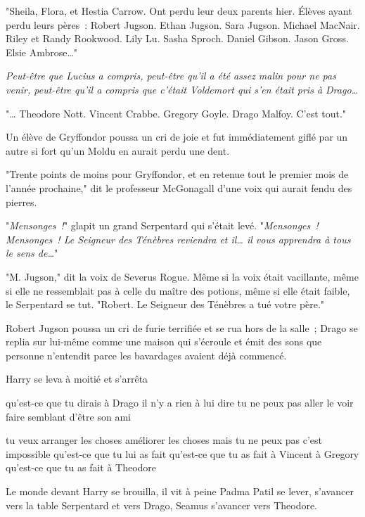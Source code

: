 "Sheila, Flora, et Hestia Carrow. Ont perdu leur deux parents hier. Élèves ayant perdu leurs pères~: Robert Jugson. Ethan Jugson. Sara Jugson. Michael MacNair. Riley et Randy Rookwood. Lily Lu. Sasha Sproch. Daniel Gibson. Jason Gross. Elsie Ambrose…"

\emph{Peut-être que Lucius a compris, peut-être qu'il a été assez malin pour ne pas venir, peut-être qu'il a compris que c'était Voldemort qui s'en était pris à Drago…}

"… Theodore Nott. Vincent Crabbe. Gregory Goyle. Drago Malfoy. C'est tout."

Un élève de Gryffondor poussa un cri de joie et fut immédiatement giflé par un autre si fort qu'un Moldu en aurait perdu une dent.

"Trente points de moins pour Gryffondor, et en retenue tout le premier mois de l'année prochaine," dit le professeur McGonagall d'une voix qui aurait fendu des pierres.

"\emph{Mensonges~!}" glapit un grand Serpentard qui s'était levé. "\emph{Mensonges~! Mensonges~! Le Seigneur des Ténèbres reviendra et il… il vous apprendra à tous le sens de…}"

"M. Jugson," dit la voix de Severus Rogue. Même si la voix était vacillante, même si elle ne ressemblait pas à celle du maître des potions, même si elle était faible, le Serpentard se tut. "Robert. Le Seigneur des Ténèbres a tué votre père."

Robert Jugson poussa un cri de furie terrifiée et se rua hors de la salle~; Drago se replia sur lui-même comme une maison qui s'écroule et émit des sons que personne n'entendit parce les bavardages avaient déjà commencé.

Harry se leva à moitié et s'arrêta

qu'est-ce que tu dirais à Drago il n'y a rien à lui dire tu ne peux pas aller le voir faire semblant d'être son ami

tu veux arranger les choses améliorer les choses mais tu ne peux pas c'est impossible qu'est-ce que tu lui as fait qu'est-ce que tu as fait à Vincent à Gregory qu'est-ce que tu as fait à Theodore

Le monde devant Harry se brouilla, il vit à peine Padma Patil se lever, s'avancer vers la table Serpentard et vers Drago, Seamus s'avancer vers Theodore.

